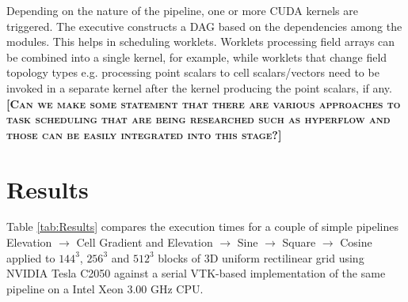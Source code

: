 \documentclass{vgtc}                          %
\newcommand{\fix}[1]{{\color{red}\textbf{\textsc{[#1]}}}}
\begin{document}
Depending on the nature of the pipeline, one or more CUDA kernels are triggered.
The executive constructs a DAG based on the dependencies among the modules. This
helps in scheduling worklets.  Worklets processing field arrays can be combined
into a single kernel, for example, while worklets that change field topology types e.g.
processing point scalars to cell scalars/vectors need to be invoked in a separate
kernel after the kernel producing the point scalars, if any. \fix{Can we make
some statement that there are various approaches to task scheduling that are
being researched such as hyperflow and those can be easily integrated into
this stage?}


\section{Results}
\label{sec:Results}

Table \ref{tab:Results} compares the execution times for a couple of simple
pipelines Elevation $\rightarrow$ Cell Gradient and Elevation $\rightarrow$
Sine $\rightarrow$ Square $\rightarrow$ Cosine applied to $144^3$, $256^3$
and $512^3$ blocks of 3D uniform
rectilinear grid using NVIDIA Tesla C2050 against a serial VTK-based
implementation of the same pipeline on a Intel Xeon 3.00 GHz CPU.
\end{document}
